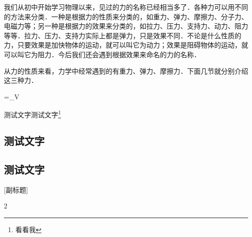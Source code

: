 \begin{Project}
我们从初中开始学习物理以来，见过的力的名称已经相当多了．各种力可以用不同的方法来分类．一种是根据力的性质来分类的，如重力、弹力、摩擦力、分子力、电磁力等；另一种是根据力的效果来分类的，如拉力、压力、支持力、动力、阻力等等．拉力、压力、支持力实际上都是弹力，只是效果不同．不论是什么性质的力，只要效果是加快物体的运动，就可以叫它为动力；效果是阻碍物体的运动，就可以叫它为阻力．今后我们还会遇到根据效果来命名的力的名称．

从力的性质来看，力学中经常遇到的有重力、弹力、摩擦力．下面几节就分别介绍这三种力．


\begin{Example}[测试文字]
	\lipsum[1][1-7]
	\begin{flalign}
		\Psi=\int_\Omega{}V
	\end{flalign}
\end{Example}

\begin{Answer*}
	测试文字测试文字\footnote{看看我}
\end{Answer*}


\subsection{测试文字}
\subsection*{测试文字}[副标题]
\zhlipsum[1]


\makeatletter



\makeatother

\begin{multicols}{2}
\Basic

\Complex
\end{multicols}

\zhlipsum[1]

















\clearpage


\end{Project}
